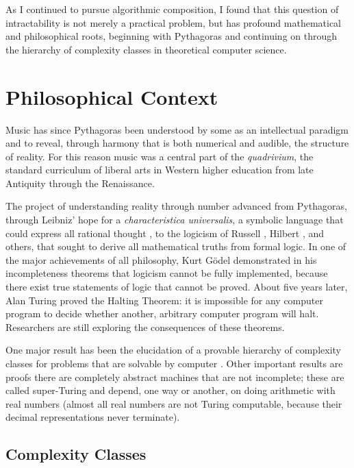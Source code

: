 \documentclass[11pt]{scrartcl}
\begin{document}
As I continued to pursue algorithmic composition, I found that this question of intractability is not merely a practical problem, but has profound mathematical and philosophical roots, beginning with Pythagoras and continuing on through the hierarchy of complexity classes in theoretical computer science. 

\section*{Philosophical Context}

Music has since Pythagoras \parencite{sep-pythagoras, huffman2014history} been understood by some as an intellectual paradigm and to reveal, through harmony that is both numerical and audible, the structure of reality. For this reason music was a central part of the \emph{quadrivium}, the standard curriculum of liberal arts in Western higher education from late Antiquity through the Renaissance.

The project of understanding reality through number advanced from Pythagoras, through Leibniz' 
hope for a \emph{characteristica universalis}, a symbolic language that could express all rational thought \parencite{davis2018universal}, to the logicism of Russell \parencite{sep-logicism}, Hilbert \parencite{sep-hilbert-program}, and others, that sought to derive all mathematical truths from formal logic. In one of the major achievements of all philosophy, Kurt Gödel \parencite{godel1986} demonstrated in his incompleteness theorems that logicism cannot be fully implemented, because there exist true statements of logic that cannot  be proved. About five years later, Alan Turing proved the Halting Theorem: it is impossible for any computer program to decide whether another, arbitrary computer program will halt. Researchers are still exploring the consequences of these theorems.

One major result has been the elucidation of a provable hierarchy of complexity classes for problems that are solvable by computer \parencite{arora2009computational}. Other important results are proofs there are completely abstract machines that are not incomplete; these are called super-Turing and depend, one way or another, on doing arithmetic with real numbers (almost all real numbers are not Turing computable, because their decimal representations never terminate).

 \subsection*{Complexity Classes} \label{sec:complexity}
 
\end{document}
